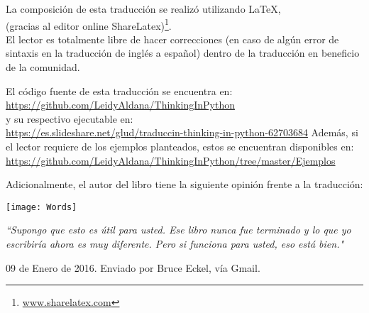 \newpage
\thispagestyle{empty}


La composición de esta traducción se realizó utilizando \LaTeX, \\(gracias al editor online ShareLatex)\footnote{\url{www.sharelatex.com}}. \\

El lector es totalmente libre de hacer correcciones (en caso de algún error de sintaxis en la traducción de inglés a español) dentro de la traducción en beneficio de la comunidad. \\

\begin{center}

El código fuente de esta traducción se encuentra en: \\
\url{https://github.com/LeidyAldana/ThinkingInPython}  \\
y su respectivo ejecutable en: \\ \url{https://es.slideshare.net/glud/traduccin-thinking-in-python-62703684}
\vspace{0.6cm}
Además, si el lector requiere de los ejemplos planteados, estos se encuentran disponibles en:\\ \url{https://github.com/LeidyAldana/ThinkingInPython/tree/master/Ejemplos}

\end{center}

\vspace{0.6cm}

Adicionalmente, el autor del libro tiene la siguiente opinión frente a la traducción:

\vspace{0.6cm}

\texttt{[image: Words]}

\vspace{0.6cm}

\textit{ “Supongo que esto es útil para usted. Ese libro nunca fue terminado y lo que yo escribiría ahora es muy diferente. Pero si funciona para usted, eso está bien."  }   

\begin{flushright}

09 de Enero de 2016. Enviado por Bruce Eckel, vía Gmail.
    
\end{flushright}


\newpage

